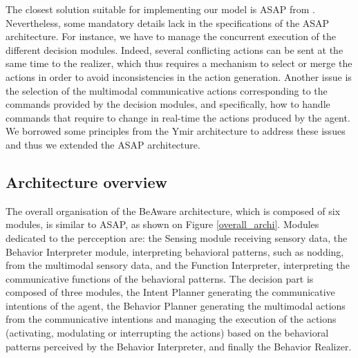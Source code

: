 The closest solution suitable for implementing our model is ASAP from \cite{kopp_architecture_2014}.
Nevertheless, some mandatory details lack in the specifications of the ASAP architecture. For instance, we have to manage the concurrent execution of the different decision modules. Indeed, several conflicting actions can be sent at the same time to the realizer, which thus requires a mechanism to select or merge the actions in order to avoid inconsistencies in the action generation. Another issue is the selection of the multimodal communicative actions corresponding to the commands provided by the decision modules, and specifically, how to handle commands that require to change in real-time the actions produced by the agent. 
We borrowed some principles from the Ymir architecture \cite{thorisson_mind_1999} to address these issues and thus we extended the ASAP architecture.  

\subsection{Architecture overview}

The overall organisation of the BeAware architecture, which is composed of six modules, is similar to ASAP, as shown on Figure \ref{overall_archi}. 
Modules dedicated to the percception are: 
the Sensing module receiving sensory data, 
the Behavior Interpreter module, interpreting behavioral patterns, such as nodding, from the multimodal sensory data, 
and the Function Interpreter, interpreting the communicative functions of the behavioral patterns. 
The decision part is composed of three modules, 
the Intent Planner generating the communicative intentions of the agent, 
the Behavior Planner generating the multimodal actions from the communicative intentions and managing the execution of the actions (activating, modulating or interrupting the actions) based on the behavioral patterns perceived by the Behavior Interpreter,
and finally the Behavior Realizer. 

